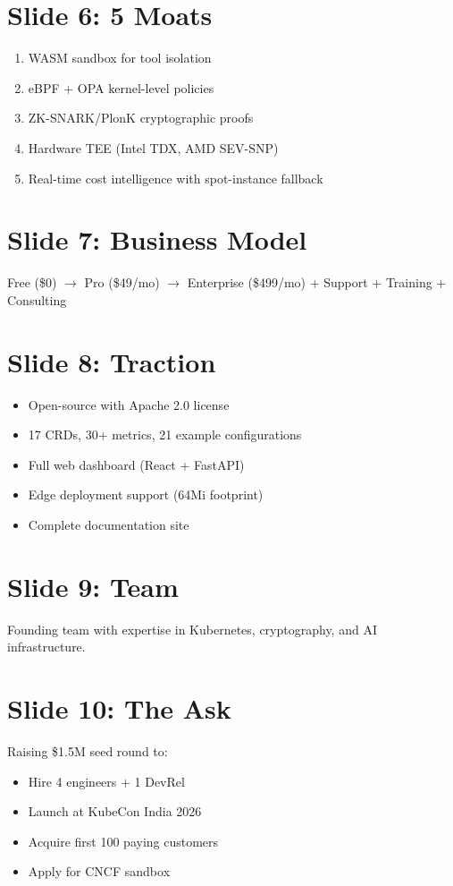\documentclass[12pt,a4paper,openany]{report}
\begin{document}
\section{Slide 6: 5 Moats}
\begin{enumerate}
    \item WASM sandbox for tool isolation
    \item eBPF + OPA kernel-level policies
    \item ZK-SNARK/PlonK cryptographic proofs
    \item Hardware TEE (Intel TDX, AMD SEV-SNP)
    \item Real-time cost intelligence with spot-instance fallback
\end{enumerate}

\section{Slide 7: Business Model}
Free (\$0) $\rightarrow$ Pro (\$49/mo) $\rightarrow$ Enterprise (\$499/mo) + Support + Training + Consulting

\section{Slide 8: Traction}
\begin{itemize}
    \item Open-source with Apache 2.0 license
    \item 17 CRDs, 30+ metrics, 21 example configurations
    \item Full web dashboard (React + FastAPI)
    \item Edge deployment support (64Mi footprint)
    \item Complete documentation site
\end{itemize}

\section{Slide 9: Team}
Founding team with expertise in Kubernetes, cryptography, and AI infrastructure.

\section{Slide 10: The Ask}
Raising \$1.5M seed round to:
\begin{itemize}
    \item Hire 4 engineers + 1 DevRel
    \item Launch at KubeCon India 2026
    \item Acquire first 100 paying customers
    \item Apply for CNCF sandbox
\end{itemize}
\end{document}
